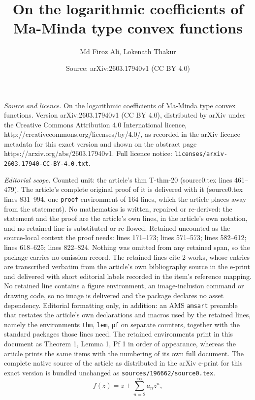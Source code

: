 \documentclass[10pt,a4paper]{amsart}
\title{On the logarithmic coefficients of Ma-Minda type convex functions}
\author{Md Firoz Ali, Lokenath Thakur}
\date{Source: arXiv:2603.17940v1 (CC BY 4.0)}
\begin{document}
\maketitle

\noindent\emph{Source and licence.} On the logarithmic coefficients of Ma-Minda type convex functions. Version arXiv:2603.17940v1 (CC BY 4.0), distributed by arXiv under the Creative Commons Attribution 4.0 International licence, http://creativecommons.org/licenses/by/4.0/, as recorded in the arXiv licence metadata for this exact version and shown on the abstract page https://arxiv.org/abs/2603.17940v1. Full licence notice: \texttt{licenses/arxiv-2603.17940-CC-BY-4.0.txt}.\par\smallskip

\noindent\textit{Editorial scope.} Counted unit: the article's thm T-thm-20 (source0.tex lines 461--479). The article's complete original proof of it is delivered with it (source0.tex lines 831--994, one \texttt{proof} environment of 164 lines, which the article places away from the statement). No mathematics is written, repaired or re-derived: the statement and the proof are the article's own lines, in the article's own notation, and no retained line is substituted or re-flowed.  Retained uncounted as the source-local context the proof needs: lines 171--173; lines 571--573; lines 582--612; lines 618--625; lines 822--824.  Nothing was omitted from any retained span, so the package carries no omission record.  The retained lines cite 2 works, whose entries are transcribed verbatim from the article's own bibliography source in the e-print and delivered with short editorial labels recorded in the item's reference mapping.  No retained line contains a figure environment, an image-inclusion command or drawing code, so no image is delivered and the package declares no asset dependency.  Editorial formatting only, in addition: an AMS \texttt{amsart} preamble that restates the article's own declarations and macros used by the retained lines, namely the environments \texttt{thm}, \texttt{lem}, \texttt{pf} on separate counters, together with the standard packages those lines need.  The retained environments print in this document as Theorem 1, Lemma 1, Pf 1 in order of appearance, whereas the article prints the same items with the numbering of its own full document.  The complete native source of the article as distributed in the arXiv e-print for this exact version is bundled unchanged as \texttt{sources/196662/source0.tex}.
\begin{equation}\label{T-05}
f(z) = z + \sum_{n=2}^\infty a_n z^n,
\end{equation}
\end{document}
